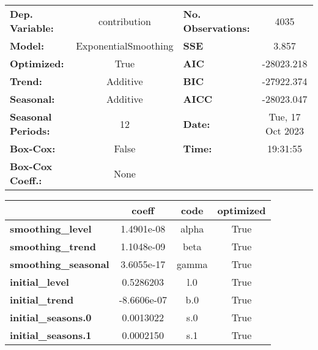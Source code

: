 \begin{center}
\begin{tabular}{lclc}
\toprule
\textbf{Dep. Variable:}      &     contribution     & \textbf{  No. Observations:  } &         4035          \\
\textbf{Model:}              & ExponentialSmoothing & \textbf{  SSE                } &        3.857          \\
\textbf{Optimized:}          &         True         & \textbf{  AIC                } &      -28023.218       \\
\textbf{Trend:}              &       Additive       & \textbf{  BIC                } &      -27922.374       \\
\textbf{Seasonal:}           &       Additive       & \textbf{  AICC               } &      -28023.047       \\
\textbf{Seasonal Periods:}   &          12          & \textbf{  Date:              } &   Tue, 17 Oct 2023    \\
\textbf{Box-Cox:}            &        False         & \textbf{  Time:              } &       19:31:55        \\
\textbf{Box-Cox Coeff.:}     &         None         & \textbf{                     } &                       \\
\bottomrule
\end{tabular}
\begin{tabular}{lccc}
                             &    \textbf{coeff}    &    \textbf{code}     &  \textbf{optimized}   \\
\midrule
\textbf{smoothing\_level}    &           1.4901e-08 &                alpha &                 True  \\
\textbf{smoothing\_trend}    &           1.1048e-09 &                 beta &                 True  \\
\textbf{smoothing\_seasonal} &           3.6055e-17 &                gamma &                 True  \\
\textbf{initial\_level}      &            0.5286203 &                  l.0 &                 True  \\
\textbf{initial\_trend}      &          -8.6606e-07 &                  b.0 &                 True  \\
\textbf{initial\_seasons.0}  &            0.0013022 &                  s.0 &                 True  \\
\textbf{initial\_seasons.1}  &            0.0002150 &                  s.1 &                 True  \\

\end{tabular}
\end{center}
